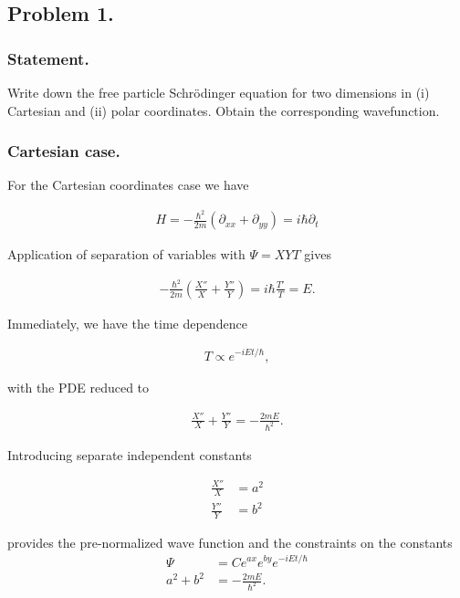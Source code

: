 \subsection{Problem 1.}
\subsubsection{Statement.}

Write down the free particle Schr\"{o}dinger equation for two dimensions in (i) Cartesian and (ii) polar coordinates.  Obtain the corresponding wavefunction.

\subsubsection{Cartesian case.}

For the Cartesian coordinates case we have 

\begin{align}\label{eqn:desaiCh4:100}
H = -\frac{\hbar^2}{2m} (\partial_{xx} + \partial_{yy}) = i \hbar \partial_t
\end{align}

Application of separation of variables with $\Psi = XYT$ gives 

\begin{align}\label{eqn:desaiCh4:101}
-\frac{\hbar^2}{2m} \left( \frac{X''}{X} +\frac{Y''}{Y} \right) = i \hbar \frac{T'}{T} = E .
\end{align}

Immediately, we have the time dependence

\begin{align}\label{eqn:desaiCh4:102}
T \propto e^{-i E t/\hbar},
\end{align}

with the PDE reduced to 

\begin{align}\label{eqn:desaiCh4:103}
\frac{X''}{X} +\frac{Y''}{Y} = - \frac{2m E}{\hbar^2}.
\end{align}

Introducing separate independent constants 

\begin{align}\label{eqn:desaiCh4:104}
\frac{X''}{X} &= a^2 \\
\frac{Y''}{Y} &= b^2 
\end{align}

provides the pre-normalized wave function and the constraints on the constants
\begin{align}\label{eqn:desaiCh4:105}
\Psi &= C 
e^{ax}
e^{by}
e^{-iE t/\hbar} \\
a^2 + b^2 &= -\frac{2 m E}{\hbar^2}.
\end{align}

